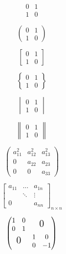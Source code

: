 \documentclass{ctexart}
\begin{document}
	\[
		\begin{matrix}
			0 & 1 \\
			1 & 0
		\end{matrix}
	\]

		\[
		\begin{pmatrix}
			0 & 1 \\
			1 & 0
		\end{pmatrix}
	\]

		\[
		\begin{bmatrix}
			0 & 1 \\
			1 & 0
		\end{bmatrix}
	\]

		\[
		\begin{Bmatrix}
			0 & 1 \\
			1 & 0
		\end{Bmatrix}
	\]	

		\[
		\begin{vmatrix}
			0 & 1 \\
			1 & 0
		\end{vmatrix}
	\]

		\[
		\begin{Vmatrix}
			0 & 1 \\
			1 & 0
		\end{Vmatrix}
	\]

			\[
		\begin{pmatrix}
			a_{11}^2 & a_{12}^2 & a_{13}^2 \\
			0 & a_{22} & a_{23}\\
			0 & 0 & a_{33}
		\end{pmatrix}
	\]
	
	\[
		\begin{bmatrix}
			a_{11} & \dots & a_{1n}\\
			& \ddots & \vdots \\
			0 & & a_{nn}
		\end{bmatrix}_{n \times n}
	\]

	\[
		\begin{pmatrix}
			\begin{matrix} 1 & 0 \\ 0 & 1 \end{matrix}
			& \text{\Large 0} \\
			\text{\Large 0} & \begin{matrix}
			1 & 0 \\ 0 & -1 \end{matrix}
		\end{pmatrix}
	\]
\end{document}

